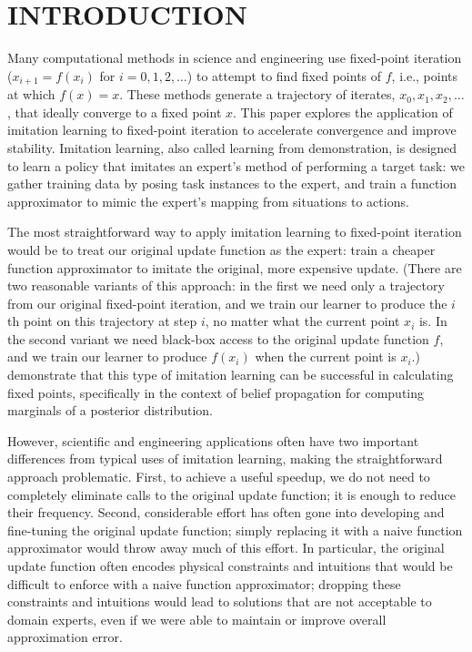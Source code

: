 \documentclass[twoside,11pt]{article}
\begin{document}
\section{INTRODUCTION}


Many computational methods in science and engineering use fixed-point iteration
(\(
x_{i+1} = f(x_i)
\) for \(i = 0, 1, 2, \ldots\))
to attempt to find fixed points of $f$, i.e., points at which $f(x)=x$. These methods generate a trajectory of iterates, $x_0, x_1, x_2, \ldots$, that ideally converge to a fixed point $x$. This paper explores the application of imitation learning to fixed-point iteration to accelerate convergence and improve stability. Imitation learning, also called learning from demonstration, is designed to learn a policy that imitates an expert's method of performing a target task: we gather training data by posing task instances to the expert, and train a function approximator to mimic the expert's mapping from situations to actions.

The most straightforward way to apply imitation learning to fixed-point iteration would be to treat our original update function as the expert: train a cheaper function approximator to imitate the original, more expensive update.  (There are two reasonable variants of this approach: in the first we need only a trajectory from our original fixed-point iteration, and we train our learner to produce the $i$th point on this trajectory at step $i$, no matter what the current point $x_i$ is. In the second variant we need black-box access to the original update function $f$, and we train our learner to produce $f(x_i)$ when the current point is $x_i$.) \citet{rossBP} demonstrate that this type of imitation learning can be successful in calculating fixed points, specifically in the context of belief propagation for computing marginals of a posterior distribution.

However, scientific and engineering applications often have two important differences from typical uses of imitation learning, making the straightforward approach problematic.  First, to achieve a useful speedup, we do not need to completely eliminate calls to the original update function; it is enough to reduce their frequency.  Second, considerable effort has often gone into developing and fine-tuning the original update function; simply replacing it with a naive function approximator would throw away much of this effort.  In particular, the original update function often encodes physical constraints and intuitions that would be difficult to enforce with a naive function approximator; dropping these constraints and intuitions would lead to solutions that are not acceptable to domain experts, even if we were able to maintain or improve overall approximation error.
\end{document}
